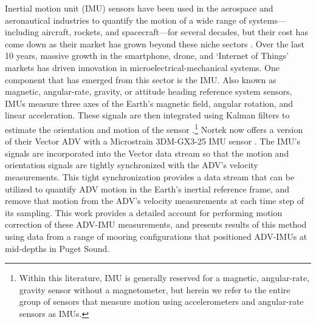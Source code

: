 Inertial motion unit (IMU) sensors have been used in the aerospace and aeronautical industries to quantify the motion of a wide range of systems---including aircraft, rockets, and spacecraft---for several decades, but their cost has come down as their market has grown beyond these niche sectors \cite[]{Bevly2004}. Over the last 10 years, massive growth in the smartphone, drone, and `Internet of Things' markets has driven innovation in microelectrical-mechanical systems. One component that has emerged from this sector is the IMU. Also known as magnetic, angular-rate, gravity, or attitude heading reference system sensors, IMUs measure three axes of the Earth's magnetic field, angular rotation, and linear acceleration. These signals are then integrated using Kalman filters to estimate the orientation and motion of the sensor \cite[]{Barshan+Whyte1995, Marins++2001, Bachmann++2003}.\footnote{Within this literature, IMU is generally reserved for a magnetic, angular-rate, gravity sensor without a magnetometer, but herein we refer to the entire group of sensors that measure motion using accelerometers and angular-rate sensors as IMUs.}
%
%
Nortek now offers a version of their Vector ADV with a Microstrain 3DM-GX3-25 IMU sensor \cite[]{vector_manual2005, MicroStrain2012a}. The IMU's signals are incorporated into the Vector data stream so that the motion and orientation signals are tightly synchronized with the ADV's velocity measurements. This tight synchronization provides a data stream that can be utilized to quantify ADV motion in the Earth's inertial reference frame, and remove that motion from the ADV's velocity measurements at each time step of its sampling. This work provides a detailed account for performing motion correction of these ADV-IMU measurements, and presents results of this method using data from a range of mooring configurations that positioned ADV-IMUs at mid-depths in Puget Sound. 


